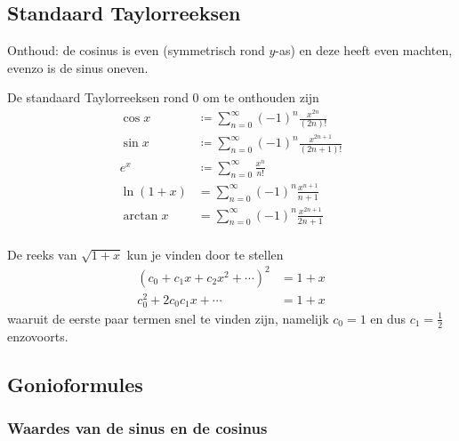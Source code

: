 \documentclass{article}
\begin{document}
	\subsection{Standaard Taylorreeksen}

	Onthoud: de cosinus is even (symmetrisch rond $y$-as) en deze heeft even machten, evenzo is de sinus oneven.

	De standaard Taylorreeksen rond 0 om te onthouden zijn
	\begin{align*}
		\cos x &\coloneqq \sum_{n=0}^\infty (-1)^n \frac{x^{2n}}{(2n)!} \\
		\sin x &\coloneqq \sum_{n=0}^\infty (-1)^n \frac{x^{2n+1}}{(2n+1)!} \\
		e^x &\coloneqq \sum_{n=0}^\infty \frac{x^n}{n!} \\
		\ln (1+x) &= \sum_{n=0}^\infty (-1)^{n} \frac{x^{n+1}}{n+1} \\
		\arctan x &= \sum_{n=0}^\infty (-1)^n \frac{x^{2n+1}}{2n+1} \\
	\end{align*}

	De reeks van $\sqrt{1+x}$ kun je vinden door te stellen
	\begin{align*}
		\left( c_0 + c_1 x + c_2 x^2 + \dotsm \right)^2 &= 1+x \\
		c_0^2 + 2 c_0 c_1 x + \dotsm &= 1+x
	\end{align*}
	waaruit de eerste paar termen snel te vinden zijn, namelijk $c_0=1$ en dus $c_1 = \frac 1 2$ enzovoorts.

	\subsection{Gonioformules} \label{gonioformules}

        \subsubsection{Waardes van de sinus en de cosinus}
\end{document}
